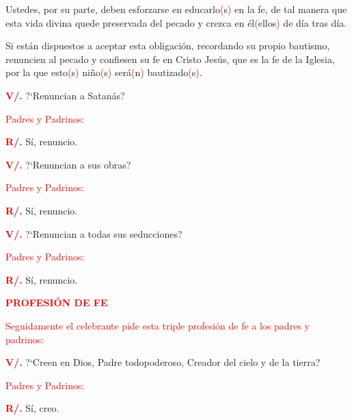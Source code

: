 \documentclass[12pt, letterpaper]{report}
\begin{document}
\noindent
Ustedes, por su parte, deben esforzarse en educarlo\textcolor{red}{(}s\textcolor{red}{)} en la fe, de tal manera que esta vida divina quede preservada del pecado y crezca en \'el\textcolor{red}{(}ellos\textcolor{red}{)} de d\'ia tras d\'ia.

\noindent
Si est\'an dispuestos a aceptar esta obligaci\'on, recordando su propio bautismo, renuncien al pecado y confiesen su fe en Cristo Jes\'us, que es la fe de la Iglesia, por la que esto\textcolor{red}{(}s\textcolor{red}{)} ni\~no\textcolor{red}{(}s\textcolor{red}{)} ser\'a\textcolor{red}{(}n\textcolor{red}{)} bautizado\textcolor{red}{(}s\textcolor{red}{)}.

\Large {\bfseries \textcolor{red}{V/.}} \hspace{0.5cm} ?`Renuncian a Satan\'as?

\large {\textcolor{red}{Padres y Padrinos:}}

\Large {\bfseries \textcolor{red}{R/.}} \hspace{0.5cm} S\'i, renuncio. 

\Large {\bfseries \textcolor{red}{V/.}} \hspace{0.5cm} ?`Renuncian a sus obras?

\large {\textcolor{red}{Padres y Padrinos:}}

\Large {\bfseries \textcolor{red}{R/.}} \hspace{0.5cm} S\'i, renuncio. 

\Large {\bfseries \textcolor{red}{V/.}} \hspace{0.5cm} ?`Renuncian a todas sus seducciones?

\large {\textcolor{red}{Padres y Padrinos:}}

\Large {\bfseries \textcolor{red}{R/.}} \hspace{0.5cm} S\'i, renuncio. 

\Large {\bfseries \textcolor{red}{PROFESI\'ON DE FE}} 

\large {\textcolor{red}{Seguidamente el celebrante pide esta triple profesi\'on de fe a los padres y padrinos:}} 

\Large {\bfseries \textcolor{red}{V/.}} \hspace{0.5cm} ?`Creen en Dios, Padre todopoderoso, Creador del cielo y de la tierra?

\large {\textcolor{red}{Padres y Padrinos:}}

\Large {\bfseries \textcolor{red}{R/.}} \hspace{0.5cm} S\'i, creo. 
\end{document}

